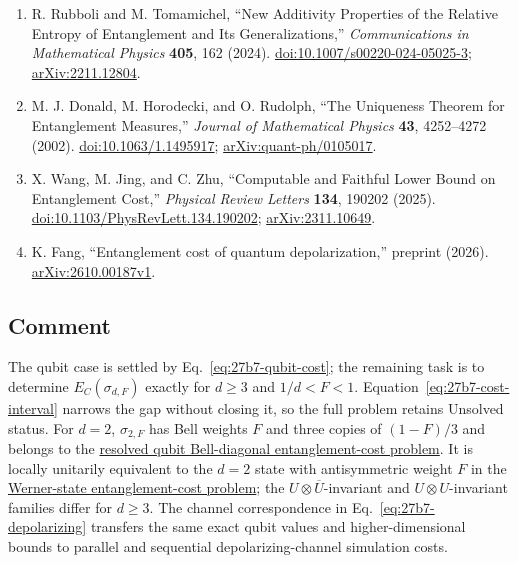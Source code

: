 \begin{enumerate}[label={},leftmargin=4.8em,labelsep=0.5em]
  \item[\textup{[RT24]}]\label{ref:27b7-rubboli-tomamichel}
  R. Rubboli and M. Tomamichel,
  ``New Additivity Properties of the Relative Entropy of Entanglement and Its
  Generalizations,''
  \emph{Communications in Mathematical Physics} \textbf{405}, 162 (2024).
  \href{https://doi.org/10.1007/s00220-024-05025-3}{doi:10.1007/s00220-024-05025-3};
  \href{https://arxiv.org/abs/2211.12804}{arXiv:2211.12804}.

  \item[\textup{[DHR02]}]\label{ref:27b7-donald-horodecki-rudolph}
  M. J. Donald, M. Horodecki, and O. Rudolph,
  ``The Uniqueness Theorem for Entanglement Measures,''
  \emph{Journal of Mathematical Physics} \textbf{43}, 4252--4272 (2002).
  \href{https://doi.org/10.1063/1.1495917}{doi:10.1063/1.1495917};
  \href{https://arxiv.org/abs/quant-ph/0105017}{arXiv:quant-ph/0105017}.

  \item[\textup{[WJZ25]}]\label{ref:27b7-wang-jing-zhu}
  X. Wang, M. Jing, and C. Zhu,
  ``Computable and Faithful Lower Bound on Entanglement Cost,''
  \emph{Physical Review Letters} \textbf{134}, 190202 (2025).
  \href{https://doi.org/10.1103/PhysRevLett.134.190202}{doi:10.1103/PhysRevLett.134.190202};
  \href{https://arxiv.org/abs/2311.10649}{arXiv:2311.10649}.

  \item[\textup{[Fan26]}]\label{ref:27b7-fang}
  K. Fang, ``Entanglement cost of quantum depolarization,''
  preprint (2026).
  \href{https://arxiv.org/abs/2610.00187v1}{arXiv:2610.00187v1}.
\end{enumerate}

\subsection*{Comment}

The qubit case is settled by Eq.~\eqref{eq:27b7-qubit-cost}; the
remaining task is to determine $E_C(\sigma_{d,F})$ exactly for $d\geq3$ and
$1/d<F<1$.  Equation~\eqref{eq:27b7-cost-interval} narrows the gap without
closing it, so the full problem retains Unsolved status.
For $d=2$, $\sigma_{2,F}$ has Bell weights $F$ and three copies of $(1-F)/3$
and belongs to the \href{https://qiqc-op.com/problem/op_aa21ac5ebca8b888/}{resolved qubit Bell-diagonal entanglement-cost problem}.
It is locally unitarily equivalent to the $d=2$ state with antisymmetric
weight $F$ in the \href{https://qiqc-op.com/problem/op_0c23167deb384894/}{Werner-state entanglement-cost problem};
the $U\otimes\overline U$-invariant and $U\otimes U$-invariant families differ
for $d\geq3$.  The channel correspondence in Eq.~\eqref{eq:27b7-depolarizing}
transfers the same exact qubit values and higher-dimensional bounds to
parallel and sequential depolarizing-channel simulation costs.

